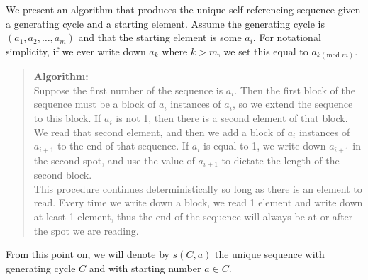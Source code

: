 \documentclass[runningheads,a4paper]{llncs}
\begin{document}
We present an algorithm that produces the unique self-referencing sequence given a generating cycle and a starting element. Assume the generating cycle is $(a_1,a_2,\dots,a_m)$ and that the starting element is some $a_i$. For notational simplicity, if we ever write down $a_k$ where $k > m$, we set this equal to $a_{k (\text{mod } m)}$.
\begin{quote}
\textbf{Algorithm:}\\
Suppose the first number of the sequence is $a_i$. Then the first block of the sequence must be a block of $a_i$ instances of $a_i$, so we extend the sequence to this block. If $a_i$ is not 1, then there is a second element of that block. We read that second element, and then we add a block of $a_i$ instances of $a_{i+1}$ to the end of that sequence. If $a_i$ is equal to 1, we write down $a_{i+1}$ in the second spot, and use the value of $a_{i+1}$ to dictate the length of the second block.\\

This procedure continues deterministically so long as there is an element to read. Every time we write down a block, we read 1 element and write down at least 1 element, thus the end of the sequence will always be at or after the spot we are reading.
\end{quote}

From this point on, we will denote by $s(C,a)$ the unique sequence with generating cycle $C$ and with starting number $a \in C$.
\end{document}
